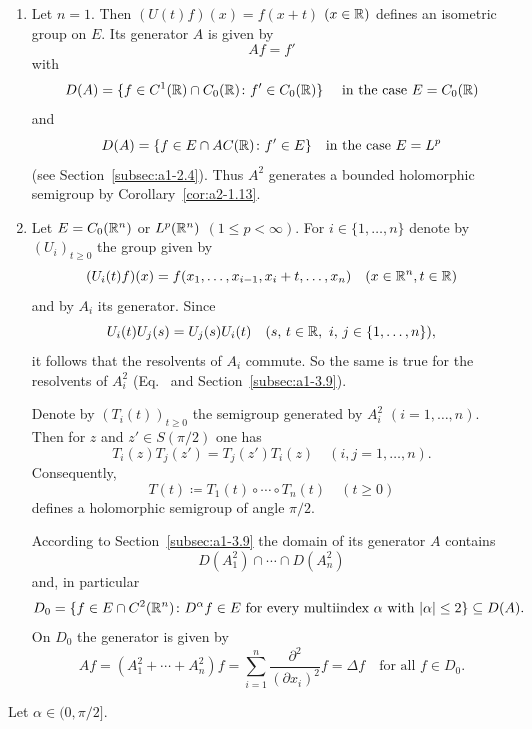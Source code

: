 \begin{example*}[The Laplacian on $E = C_{0}(\R^{n})$ or $L^{p}(\R^{n})$ $(1 \leq p < \infty)$]\label{ex:a2-1.13-kgk} 
\begin{enumerate}[\upshape (i), wide, labelindent=.25em]
\item \label{ex:a2-1.13-kgk-1}
Let $n = 1$.
Then $(U(t)f)(x) = f(x+t)$ $(x \in \mathbb{R})$ defines an isometric group on $E$.
Its generator $A$ is given by 
\[
Af = f'
\]  
with
\[
D(A) = \{f \in C^{1}(\mathbb{R}) \cap C_{0}(\mathbb{R}) \colon f' \in C_{0}(\mathbb{R})\}
\quad \text{ in the case } E = C_{0}(\mathbb{R})
\]
and
\[
D(A) = \{f \in E \cap AC(\mathbb{R}) \colon f' \in E\} \quad \text{in the case } E = L^{p}
\] 
(see Section~\ref{subsec:a1-2.4}).
Thus $A^{2}$ generates a bounded holomorphic semigroup by Corollary~\ref{cor:a2-1.13}. 
\item \label{ex:a2-1.13-kgk-2}
Let $E = C_{0}(\R^{n})$ or $L^{p}(\R^{n})$ $(1 \leq p < \infty)$.
For $i \in \{1,\ldots,n\}$ denote by $(U_{i})_{t \geq 0}$ the group given by 
\[
(U_{i}(t)f)(x) = f(x_{1},\ldots,x_{i-1},x_{i}+t,\ldots,x_{n}) \quad  (x \in \mathbb{R}^{n}, t \in \mathbb{R})
\]
and by $A_{i}$ its generator.
Since 
\[ U_{i}(t)U_{j}(s) = U_{j}(s)U_{i}(t) \quad (s,\,t \in \mathbb{R},\ i,\,j \in \{1, \ldots, n \}), 
\]
it follows that the resolvents of\/ $A_{i}$ commute.
So the same is true for the resolvents of\/ $A_{i}^{2}$ (\cf Eq.~ and 
Section~\ref{subsec:a1-3.9}). 

Denote by $(T_{i}(t))_{t \geq 0}$ 
the semigroup generated by $A_{i}^{2}$ $(i=1,\ldots,n)$.
Then for $z$ and $z' \in S(\pi/2)$ one has 
%
\[
	T_{i}(z)T_{j}(z') = T_{j}(z')T_{i}(z) \quad (i,j=1,\ldots,n) .
\]
%
Consequently, 
%
\[
	T(t) \coloneq T_{1}(t) \circ \cdots \circ T_{n}(t) \quad (t \geq 0)
\]
%
defines a holomorphic semigroup of angle $\pi/2$.

According to Section~\ref{subsec:a1-3.9} the domain of its generator $A$ contains 
%
\[
	D(A_{1}^{2}) \cap \cdots \cap D(A_{n}^{2})
\]
%
and, in particular
\[
D_{0} = \{f \in E \cap C^{2}(\R^{n}) \colon D^{\alpha}f \in E \text{ for every multiindex } \alpha \text{ with } |\alpha| \leq 2\} \subseteq D(A) .
\]
On $D_{0}$ the generator is given by
\[
    Af = (A_{1}^{2} + \cdots + A_{n}^{2})f =
    \sum_{i = 1}^{n} \frac{\partial^{2}}{(\partial x_{i})^{2}} f
    = \Delta f \quad \text{for all $f \in D_{0}$.} 
\]
\end{enumerate}
\end{example*}
Let $\alpha \in (0,\pi/2]$.
